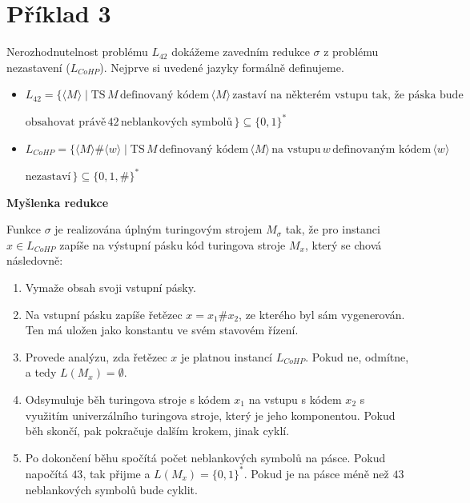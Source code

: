 \documentclass[11pt, a4paper, titlepage]{article}
\begin{document}
\newpage


\section*{Příklad 3}

Nerozhodnutelnost problému $L_{42}$ dokážeme zavedním redukce $\sigma$ z problému nezastavení ($L_{CoHP}$). Nejprve si uvedené jazyky formálně definujeme.

\begin{itemize}

    \item $L_{42} = \{ \langle M \rangle \mid \textrm{TS} \, M \, \textrm{definovaný kódem} \, \langle M \rangle \, \textrm{zastaví na některém vstupu tak, že páska bude}$

    $\textrm{obsahovat právě} \, 42 \, \textrm{neblankových symbolů} \, \} \subseteq \{0, 1\}^*$

    \item $L_{CoHP} = \{ \langle M \rangle \# \langle w \rangle \mid \textrm{TS} \, M \, \textrm{definovaný kódem} \, \langle M \rangle \, \textrm{na vstupu} \, w \, \textrm{definovaným kódem} \, \langle w \rangle$

    $\textrm{nezastaví} \, \} \subseteq \{0, 1, \#\}^*$

\end{itemize}
\medskip

\textbf{Myšlenka redukce}
\bigskip

Funkce $\sigma$ je realizována úplným turingovým strojem $M_{\sigma}$ tak, že pro instanci $x \in L_{CoHP}$  zapíše na výstupní pásku kód turingova stroje $M_x$, který se chová následovně:

\begin{enumerate}

\item Vymaže obsah svoji vstupní pásky.

\item Na vstupní pásku zapíše řetězec $x=x_1 \# x_2$, ze kterého byl sám vygenerován. Ten má uložen jako konstantu ve svém stavovém řízení.

\item Provede analýzu, zda řetězec $x$ je platnou instancí $L_{CoHP}$. Pokud ne, odmítne, a tedy $L(M_x) = \emptyset$.

\item Odsymuluje běh turingova stroje s kódem $x_1$ na vstupu s kódem $x_2$ s využitím univerzálního turingova stroje, který je jeho komponentou. Pokud běh skončí, pak pokračuje dalším krokem, jinak cyklí.

\item Po dokončení běhu spočítá počet neblankových symbolů na pásce. Pokud napočítá $43$, tak přijme a $L(M_x) = \{0, 1\}^*$. Pokud je na pásce méně než $43$ neblankových symbolů bude cyklit.

\end{enumerate}
\medskip
\end{document}
